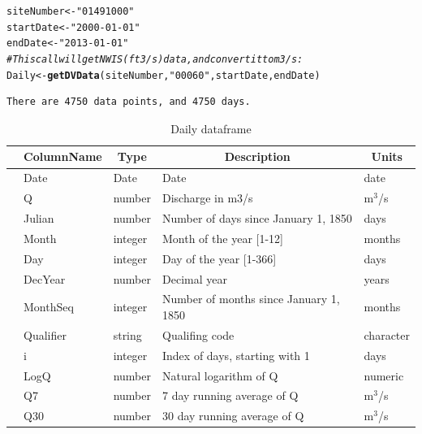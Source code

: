 \documentclass[a4paper,11pt]{article}\usepackage[]{graphicx}\usepackage[]{color}
\makeatletter
\newcommand{\hlstr}[1]{\textcolor[rgb]{0.192,0.494,0.8}{#1}}%
\newcommand{\hlcom}[1]{\textcolor[rgb]{0.678,0.584,0.686}{\textit{#1}}}%
\newcommand{\hlstd}[1]{\textcolor[rgb]{0.345,0.345,0.345}{#1}}%
\newcommand{\hlkwb}[1]{\textcolor[rgb]{0.69,0.353,0.396}{#1}}%
\newcommand{\hlkwd}[1]{\textcolor[rgb]{0.737,0.353,0.396}{\textbf{#1}}}%
\newenvironment{kframe}{%
 \def\at@end@of@kframe{}%
 \ifinner\ifhmode%
  \def\at@end@of@kframe{\end{minipage}}%
  \begin{minipage}{\columnwidth}%
 \fi\fi%
 \def\FrameCommand##1{\hskip\@totalleftmargin \hskip-\fboxsep
 \colorbox{shadecolor}{##1}\hskip-\fboxsep
     \hskip-\linewidth \hskip-\@totalleftmargin \hskip\columnwidth}%
 \MakeFramed {\advance\hsize-\width
   \@totalleftmargin\z@ \linewidth\hsize
   \@setminipage}}%
 {\par\unskip\endMakeFramed%
 \at@end@of@kframe}
\newenvironment{knitrout}{}{} %
\makeatother
\begin{document}
\begin{knitrout}
\color{fgcolor}\begin{kframe}
\begin{alltt}
\hlstd{siteNumber} \hlkwb{<-} \hlstr{"01491000"}
\hlstd{startDate} \hlkwb{<-} \hlstr{"2000-01-01"}
\hlstd{endDate} \hlkwb{<-} \hlstr{"2013-01-01"}
\hlcom{# This call will get NWIS (ft3/s) data , and convert it to m3/s:}
\hlstd{Daily} \hlkwb{<-} \hlkwd{getDVData}\hlstd{(siteNumber,} \hlstr{"00060"}\hlstd{, startDate, endDate)}
\end{alltt}
\begin{verbatim}
There are 4750 data points, and 4750 days.
\end{verbatim}
\end{kframe}
\end{knitrout}



\begin{table}[ht]
\caption{Daily dataframe} 
\label{tab:DailyDF1}
{\footnotesize
\begin{tabular}{rllll}
  \hline
 & \multicolumn{1}{c}{\textbf{\textsf{ColumnName}}} & \multicolumn{1}{c}{\textbf{\textsf{Type}}} & \multicolumn{1}{c}{\textbf{\textsf{Description}}} & \multicolumn{1}{c}{\textbf{\textsf{Units}}} \\ 
  \hline
 & Date & Date & Date & date \\ 
  [5pt] & Q & number & Discharge in m3/s & m$^3$/s \\ 
  [5pt] & Julian & number & Number of days since January 1, 1850 & days \\ 
  [5pt] & Month & integer & Month of the year [1-12] & months \\ 
  [5pt] & Day & integer & Day of the year [1-366] & days \\ 
  [5pt] & DecYear & number & Decimal year & years \\ 
  [5pt] & MonthSeq & integer & Number of months since January 1, 1850 & months \\ 
  [5pt] & Qualifier & string & Qualifing code & character \\ 
  [5pt] & i & integer & Index of days, starting with 1 & days \\ 
  [5pt] & LogQ & number & Natural logarithm of Q & numeric \\ 
  [5pt] & Q7 & number & 7 day running average of Q & m$^3$/s \\ 
  [5pt] & Q30 & number & 30 day running average of Q & m$^3$/s \\ 
   \hline
\end{tabular}
}
\end{table}
\end{document}
